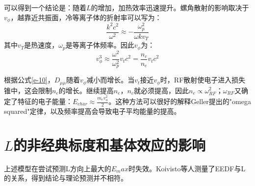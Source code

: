 \documentclass[fontset=windows]{article}
\begin{document}
可以得到一个结论是：随着$L$的增加，加热效率迅速提升。螺角散射的影响取决于$v_\phi$，越靠近共振面，冷等离子体的折射率可以写为：
\begin{equation}
    \frac{k^2c^2}{\omega^2}\approx-\frac{\omega_p^2}{\omega kv_T}
\end{equation}
其中$v_T$是热速度，$\omega_p$是等离子体频率。因此$v_\phi$为：
\begin{equation}
    v_\phi^3\approx\frac{\omega^2}{\omega_p^2}v_t c^2=\frac{n_c}{n_e}v_tc^2
\end{equation}

根据公式\ref{e-10}，$D_{\mu\mu}$随着$v_\phi$减小而增长。当$v_t$接近$v_\phi$时，RF散射使电子进入损失锥中，这会限制$n_e$的增长。继续提高$n_e$，$n_c$就必须提高，因此$n_e\propto\omega_{RF}^2$；$\omega_{RF}$又确定了特征的电子能量：$E_{char}\approx\frac{m_ev_\phi^2}{2}$。这种方法可以很好的解释Geller提出的"omega squared"定律，以及频率提高会导致电子平均能量的提高。

\section{$L$的非经典标度和基体效应的影响}
上述模型在尝试预测L方向上最大的$E_max$时失效。Koivisto等人测量了EEDF与L的关系，得到结论与理论预测并不相符。


\end{document}
